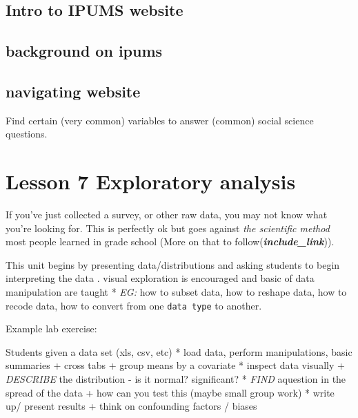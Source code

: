 \documentclass[
]{book}
\begin{document}
\hypertarget{intro-to-ipums-website}{%
\subsection*{Intro to IPUMS website}\label{intro-to-ipums-website}}

\hypertarget{background-on-ipums}{%
\subsection*{background on ipums}\label{background-on-ipums}}

\hypertarget{navigating-website}{%
\subsection*{navigating website}\label{navigating-website}}

Find certain (very common) variables to answer (common) social science questions.

\hypertarget{lesson-7-exploratory-analysis}{%
\section*{Lesson 7 Exploratory analysis}\label{lesson-7-exploratory-analysis}}

If you've just collected a survey, or other raw data, you may not know what you're looking for. This is perfectly ok but goes against \emph{the scientific method} most people learned in grade school (More on that to follow(\textbf{\emph{include\_link}})).

This unit begins by presenting data/distributions and asking students to begin interpreting the data . visual exploration is encouraged and basic of data manipulation are taught
* \emph{EG:} how to subset data, how to reshape data, how to recode data, how to convert from one \texttt{data\ type} to another.

Example lab exercise:

Students given a data set (xls, csv, etc)
* load data, perform manipulations, basic summaries
+ cross tabs
+ group means by a covariate
* inspect data visually
+ \emph{DESCRIBE} the distribution - is it normal? significant?
* \emph{FIND} aquestion in the spread of the data
+ how can you test this (maybe small group work)
* write up/ present results
+ think on confounding factors / biases
\end{document}
